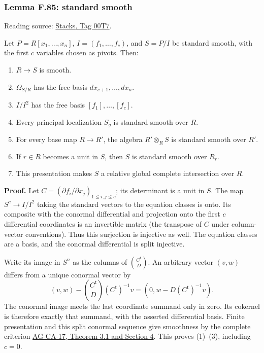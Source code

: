 \documentclass[11pt,a4paper,openany]{report}
\providecommand{\tightlist}{\setlength{\itemsep}{0pt}\setlength{\parskip}{0pt}}
\begin{document}
\label{AG-RG-S05-algebra-lemma-standard-smooth}

\subsubsection{Lemma F.85: standard smooth}\label{AG-RG-S05-lemma-f.85-standard-smooth}

Reading source: \href{https://stacks.math.columbia.edu/tag/00T7}{Stacks, Tag 00T7}.

Let \(P=R[x_1,\ldots,x_n]\), \(I=(f_1,\ldots,f_c)\), and \(S=P/I\) be standard smooth, with the first \(c\) variables chosen as pivots. Then:

\begin{enumerate}
\def\labelenumi{\arabic{enumi}.}
\tightlist
\item
  \(R\to S\) is smooth.
\item
  \(\Omega_{S/R}\) has the free basis \(dx_{c+1},\ldots,dx_n\).
\item
  \(I/I^2\) has the free basis \([f_1],\ldots,[f_c]\).
\item
  Every principal localization \(S_g\) is standard smooth over \(R\).
\item
  For every base map \(R\to R'\), the algebra \(R'\otimes_R S\) is standard smooth over \(R'\).
\item
  If \(r\in R\) becomes a unit in \(S\), then \(S\) is standard smooth over \(R_r\).
\item
  This presentation makes \(S\) a relative global complete intersection over \(R\).
\end{enumerate}

\textbf{Proof.} Let \(C=(\partial f_i/\partial x_j)_{1\le i,j\le c}\); its determinant is a unit in \(S\). The map \(S^c\to I/I^2\) taking the standard vectors to the equation classes is onto. Its composite with the conormal differential and projection onto the first \(c\) differential coordinates is an invertible matrix (the transpose of \(C\) under column-vector conventions). Thus this surjection is injective as well. The equation classes are a basis, and the conormal differential is split injective.

Write its image in \(S^n\) as the columns of \(\binom{C^{\mathsf t}}{D}\). An arbitrary vector \((v,w)\) differs from a unique conormal vector by \[
(v,w)-\binom{C^{\mathsf t}}{D}(C^{\mathsf t})^{-1}v
=(0,w-D(C^{\mathsf t})^{-1}v).
\] The conormal image meets the last coordinate summand only in zero. Its cokernel is therefore exactly that summand, with the asserted differential basis. Finite presentation and this split conormal sequence give smoothness by the complete criterion \href{https://github.com/KokunoYumeto/open-math-courses/blob/d02d0a3669f42579db037cd44de1d113fdd770a1/docs/courses/AG-CA/src/formally-smooth-unramified-and-etale-ring-maps.md}{AG-CA-17, Theorem 3.1 and Section 4}. This proves (1)--(3), including \(c=0\).
\end{document}
